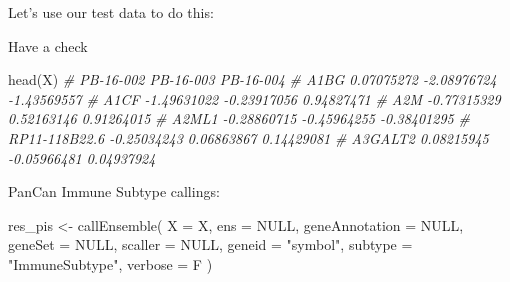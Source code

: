 \documentclass[
  12pt,
]{book}
\newenvironment{Shaded}{\begin{snugshade}}{\end{snugshade}}
\newcommand{\AttributeTok}[1]{\textcolor[rgb]{0.77,0.63,0.00}{#1}}
\newcommand{\CommentTok}[1]{\textcolor[rgb]{0.56,0.35,0.01}{\textit{#1}}}
\newcommand{\ConstantTok}[1]{\textcolor[rgb]{0.00,0.00,0.00}{#1}}
\newcommand{\FunctionTok}[1]{\textcolor[rgb]{0.00,0.00,0.00}{#1}}
\newcommand{\NormalTok}[1]{#1}
\newcommand{\OtherTok}[1]{\textcolor[rgb]{0.56,0.35,0.01}{#1}}
\newcommand{\SpecialCharTok}[1]{\textcolor[rgb]{0.00,0.00,0.00}{#1}}
\newcommand{\StringTok}[1]{\textcolor[rgb]{0.31,0.60,0.02}{#1}}
\begin{document}
Let's use our test data to do this:

\begin{Shaded}
\end{Shaded}

Have a check

\begin{Shaded}
\begin{Highlighting}[]
\FunctionTok{head}\NormalTok{(X)}
\CommentTok{\#                 PB{-}16{-}002   PB{-}16{-}003   PB{-}16{-}004}
\CommentTok{\# A1BG           0.07075272 {-}2.08976724 {-}1.43569557}
\CommentTok{\# A1CF          {-}1.49631022 {-}0.23917056  0.94827471}
\CommentTok{\# A2M           {-}0.77315329  0.52163146  0.91264015}
\CommentTok{\# A2ML1         {-}0.28860715 {-}0.45964255 {-}0.38401295}
\CommentTok{\# RP11{-}118B22.6 {-}0.25034243  0.06863867  0.14429081}
\CommentTok{\# A3GALT2        0.08215945 {-}0.05966481  0.04937924}
\end{Highlighting}
\end{Shaded}

PanCan Immune Subtype callings:

\begin{Shaded}
\begin{Highlighting}[]
\NormalTok{res\_pis }\OtherTok{\textless{}{-}} \FunctionTok{callEnsemble}\NormalTok{(}
    \AttributeTok{X =}\NormalTok{ X,}
    \AttributeTok{ens =} \ConstantTok{NULL}\NormalTok{,}
    \AttributeTok{geneAnnotation =} \ConstantTok{NULL}\NormalTok{,}
    \AttributeTok{geneSet =} \ConstantTok{NULL}\NormalTok{,}
    \AttributeTok{scaller =} \ConstantTok{NULL}\NormalTok{,}
    \AttributeTok{geneid =} \StringTok{"symbol"}\NormalTok{,}
    \AttributeTok{subtype =} \StringTok{"ImmuneSubtype"}\NormalTok{,}
    \AttributeTok{verbose =}\NormalTok{ F}
\NormalTok{  )}
\end{Highlighting}
\end{Shaded}
\end{document}
